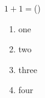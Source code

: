 \documentclass{beamer}
\begin{document}
\begin{frame}
    $1+1=$(\makebox[2cm]{})
    {
        \begin{enumerate}
            \item one
            \item two
            \item three
            \item four
        \end{enumerate}
    }
\end{frame}
\end{document}

